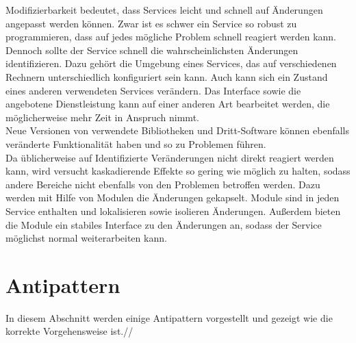 Modifizierbarkeit bedeutet, dass Services leicht und schnell auf Änderungen angepasst werden können. Zwar ist es schwer ein Service so robust zu programmieren, dass auf jedes mögliche Problem schnell reagiert werden kann. Dennoch sollte der Service schnell die wahrscheinlichsten Änderungen identifizieren. Dazu gehört die Umgebung eines Services, das auf verschiedenen Rechnern unterschiedlich konfiguriert sein kann. Auch kann sich ein Zustand eines anderen verwendeten Services verändern. Das Interface sowie die angebotene Dienstleistung kann auf einer anderen Art bearbeitet werden, die möglicherweise mehr Zeit in Anspruch nimmt.\\
Neue Versionen von verwendete Bibliotheken und Dritt-Software können ebenfalls veränderte Funktionalität haben und so zu Problemen führen.\\
Da üblicherweise auf Identifizierte Veränderungen nicht direkt reagiert werden kann, wird versucht kaskadierende Effekte so gering wie möglich zu halten, sodass andere Bereiche nicht ebenfalls von den Problemen betroffen werden. Dazu werden mit Hilfe von Modulen die Änderungen gekapselt. Module sind in jeden Service enthalten und lokalisieren sowie isolieren Änderungen. Außerdem bieten die Module ein stabiles Interface zu den Änderungen an, sodass der Service möglichst normal weiterarbeiten kann. 

\section{Antipattern}

In diesem Abschnitt werden einige Antipattern vorgestellt und gezeigt wie die korrekte Vorgehensweise ist.//

